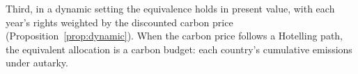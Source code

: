 \documentclass[12pt,english]{article}
\theoremstyle{remark}
\begin{document}
Third, in a dynamic setting the equivalence holds in present value, with each year's rights weighted by the discounted carbon price (Proposition~\ref{prop:dynamic}). When the carbon price follows a Hotelling path, the equivalent allocation is a carbon budget: each country's cumulative emissions under autarky. %

\end{document}

